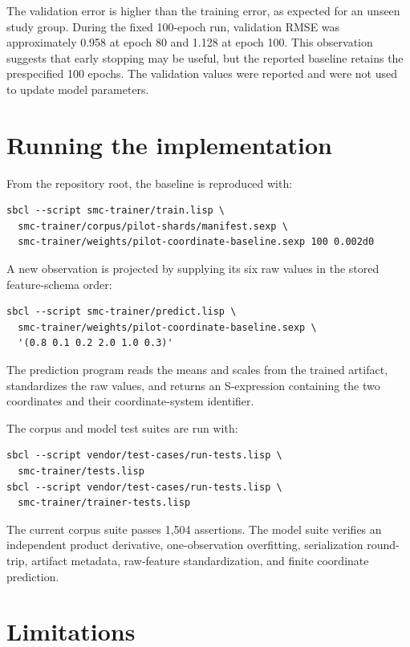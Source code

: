 \documentclass[12pt]{article}
\begin{document}
The validation error is higher than the training error, as expected for an unseen
study group.  During the fixed 100-epoch run, validation RMSE was approximately
0.958 at epoch 80 and 1.128 at epoch 100.  This observation suggests that early
stopping may be useful, but the reported baseline retains the prespecified 100
epochs.  The validation values were reported and were not used to update model
parameters.

\section{Running the implementation}

From the repository root, the baseline is reproduced with:

\begin{verbatim}
sbcl --script smc-trainer/train.lisp \
  smc-trainer/corpus/pilot-shards/manifest.sexp \
  smc-trainer/weights/pilot-coordinate-baseline.sexp 100 0.002d0
\end{verbatim}

A new observation is projected by supplying its six raw values in the stored
feature-schema order:

\begin{verbatim}
sbcl --script smc-trainer/predict.lisp \
  smc-trainer/weights/pilot-coordinate-baseline.sexp \
  '(0.8 0.1 0.2 2.0 1.0 0.3)'
\end{verbatim}

The prediction program reads the means and scales from the trained artifact,
standardizes the raw values, and returns an S-expression containing the two
coordinates and their coordinate-system identifier.

The corpus and model test suites are run with:

\begin{verbatim}
sbcl --script vendor/test-cases/run-tests.lisp \
  smc-trainer/tests.lisp
sbcl --script vendor/test-cases/run-tests.lisp \
  smc-trainer/trainer-tests.lisp
\end{verbatim}

The current corpus suite passes 1,504 assertions.  The model suite verifies an
independent product derivative, one-observation overfitting, serialization
round-trip, artifact metadata, raw-feature standardization, and finite coordinate
prediction.

\section{Limitations}
\end{document}
